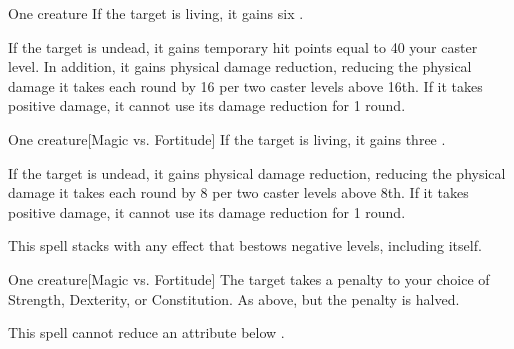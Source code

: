 \spellrng{\rngclose}
\spelldur{\durshort}
\begin{spelltarget}{One creature}
    \spelleffect If the target is living, it gains six \negativelevels.

    \spelleffect If the target is undead, it gains temporary hit points equal to 40 \add your caster level. In addition, it gains physical damage reduction, reducing the physical damage it takes each round by 16  per two caster levels above 16th. If it takes positive damage, it cannot use its damage reduction for 1 round.
\end{spelltarget}

\spellrng{\rngclose}
\spelldur{\durshort}
\begin{spelltarget}{One creature}[Magic vs. Fortitude]
    \spelleffect If the target is living, it gains three \negativelevels.

    If the target is undead, it gains physical damage reduction, reducing the physical damage it takes each round by 8  per two caster levels above 8th. If it takes positive damage, it cannot use its damage reduction for 1 round.
\end{spelltarget}
\spellnotes This spell stacks with any effect that bestows negative levels, including itself.

\spellrng{\rngmed}
\spelldur{\durshort}
\begin{spelltarget}{One creature}[Magic vs. Fortitude]
    \spellsuccess The target takes a  penalty to your choice of Strength, Dexterity, or Constitution.
    \spellfailure As above, but the penalty is halved.
\end{spelltarget}
\spellnotes This spell cannot reduce an attribute below .

